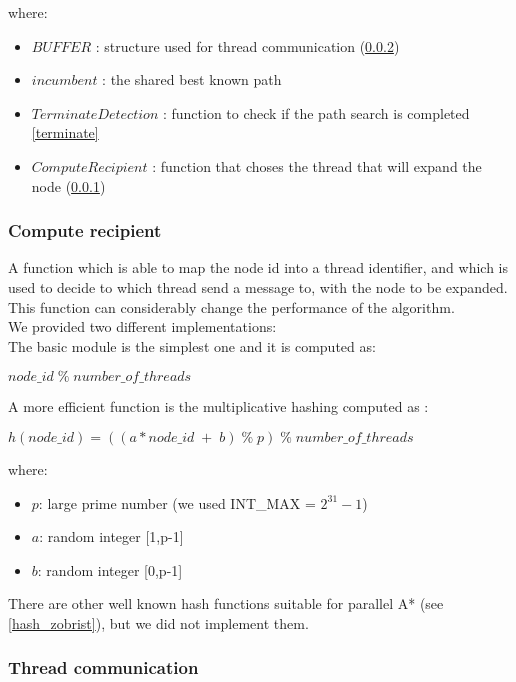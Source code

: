 \vspace{0.5cm}

where:
\begin{itemize}
    \item $BUFFER$ : structure used for thread communication (\ref{thread_buf})
    \item $incumbent$ : the shared best known path
    \item $TerminateDetection$ : function to check if the path search is completed \ref{terminate}
    \item $ComputeRecipient$ : function that choses the thread that will expand the node (\ref{compute_reci})
\end{itemize}

\subsubsection{Compute recipient}
\label{compute_reci}

A function which is able to map the node id into a thread identifier, and which is used to decide to which thread send a message to, with the node to be expanded.
This function can considerably change the performance of the algorithm.
\\ 
We provided two different implementations:
\\
The basic module is the simplest one and it is computed as: 
\begin{center}
    $node\_id \; \% \;  number\_of\_threads$
\end{center}
A more efficient function is the multiplicative hashing computed as \cite{bibVideoMulHash}:
\begin{center}
    $ h(node\_id) =((a*node\_id \; + \; b) \; \% \; p) \; \% \; number\_of\_threads $  
\end{center}
where:
\begin{itemize}
    \item $p$: large prime number (we used INT\_MAX =  $ 2^{31}-1 $)
    \item $a$: random integer [1,p-1]
    \item $b$: random integer [0,p-1]
\end{itemize}
There are other well known hash functions suitable for parallel A* (see \ref{hash_zobrist}), but we did not implement them.

\subsubsection{Thread communication}
\label{thread_buf}


